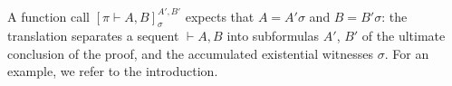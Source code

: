 \documentclass[UKenglish]{lipics-v2019}
\makeatletter
\newcommand\defn[1]{\textit{\textbf{#1}}}
\newcommand\ex[2][{}]{\textsc{ev}_{#1}(#2)}
\newcommand\dom[1]{\textsc{dom}(#1)}
\newcommand\+{+}
\renewcommand\*{\times}
\newcommand\dual[1]{\overline{#1}}
\newcommand\sub{\leq}
\newcommand\seq[2]{{\vdash}#1,#2}
\newcommand\prf[3]{#1\vdash\!#2,#3}
\newcommand\deseq[4][\sigma]{[#2]_{#1}^{#3,#4}}
\newcommand\res[1]{|_{#1}}
\newcommand\link[3][\sigma]{(#2,#3)_{#1}}
\newcommand\qrr[1]{
  \ifx#1+\expandafter\@qrr\else
  \ifx#1*\*\mathrm R\else
  \ifx#1!\forall\mathrm R\else
  \ifx#1?\expandafter\@@qrr\else
  \ifx#11\mathrm{ax}\else
  \ifx#1.\mathrm{cut}\else
  #1\mathrm R
  \fi\fi\fi\fi\fi\fi
}
\newcommand\@qrr[1]{+\mathrm R,#1}
\newcommand\@@qrr[1]{\exists\mathrm R,#1}
\makeatother
\begin{document}

A function call $\deseq{\prf\pi AB}{A'}{B'}$ expects that $A=A'\sigma$ and $B=B'\sigma$: the translation separates a sequent $\seq AB$ into subformulas $A'$, $B'$ of the ultimate conclusion of the proof, and the accumulated existential witnesses $\sigma$. For an example, we refer to the introduction.
%
%
%

\end{document}
